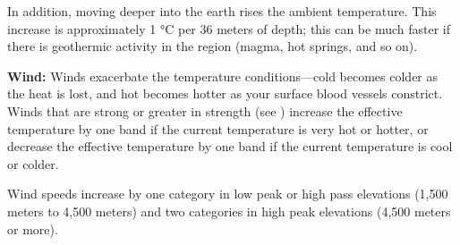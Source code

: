 In addition, moving deeper into the earth rises the ambient temperature. This increase is approximately 1 °C per 36 meters of depth; this can be much faster if there is geothermic activity in the region (magma, hot springs, and so on).

\textbf{Wind:} Winds exacerbate the temperature conditions---cold becomes colder as the heat is lost, and hot becomes hotter as your surface blood vessels constrict. Winds that are strong or greater in strength (see ) increase the effective temperature by one band if the current temperature is very hot or hotter, or decrease the effective temperature by one band if the current temperature is cool or colder.

Wind speeds increase by one category in low peak or high pass elevations (1,500 meters to 4,500 meters) and two categories in high peak elevations (4,500 meters or more).


